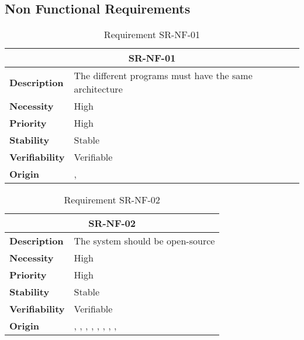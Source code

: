 \subsection{Non Functional Requirements}
\begin{table}[H]
    \centering
    \begin{tabular}{l p{10cm}}
        \toprule
        \multicolumn{2}{c}{SR-NF-01} \\
        \toprule
        \textbf{Description}        & The different programs must have the same architecture \\
        \textbf{Necessity}          &  High \\
        \textbf{Priority}           &  High \\
        \textbf{Stability}          &  Stable \\
        \textbf{Verifiability}      & Verifiable \\
        \textbf{Origin}             &  \textit{\nameref{tab:ur-re-01}}, \textit{\nameref{tab:ur-ca-14}} \\
    \end{tabular}
    \caption{Requirement SR-NF-01}
    \label{tab:sr-nf-01}
\end{table}

\begin{table}[H]
    \centering
    \begin{tabular}{l p{10cm}}
        \toprule
        \multicolumn{2}{c}{SR-NF-02} \\
        \toprule
        \textbf{Description}        & The system should be open-source \\
        \textbf{Necessity}          &  High \\
        \textbf{Priority}           &  High \\
        \textbf{Stability}          &  Stable \\
        \textbf{Verifiability}      & Verifiable \\
        \textbf{Origin}             &  \textit{\nameref{tab:ur-re-02}}, \textit{\nameref{tab:ur-ca-03}}, \textit{\nameref{tab:ur-ca-05}}, \textit{\nameref{tab:ur-ca-06}}, \textit{\nameref{tab:ur-ca-07}}, \textit{\nameref{tab:ur-ca-08}}, \textit{\nameref{tab:ur-ca-10}}, \textit{\nameref{tab:ur-ca-12}}, \textit{\nameref{tab:ur-ca-13}} \\
    \end{tabular}
    \caption{Requirement SR-NF-02}
    \label{tab:sr-nf-02}
\end{table}

